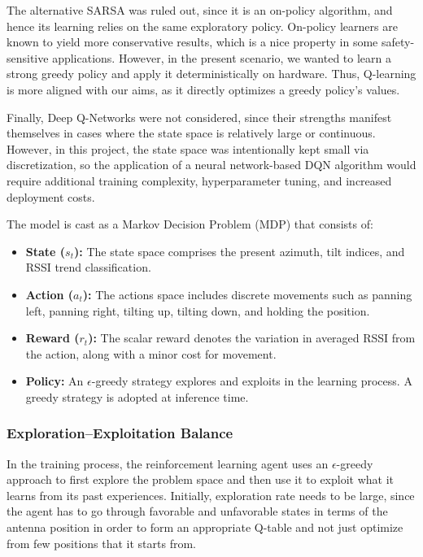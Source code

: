 The alternative SARSA was ruled out, since it is an on-policy algorithm, and hence its
learning relies on the same exploratory policy. On-policy learners are known to yield more
conservative results, which is a nice property in some safety-sensitive applications.
However, in the present scenario, we wanted to learn a strong greedy policy and apply it
deterministically on hardware. Thus, Q-learning is more aligned with our aims, as it
directly optimizes a greedy policy's values.

Finally, Deep Q-Networks were not considered, since their strengths manifest themselves
in cases where the state space is relatively large or continuous. However, in this project,
the state space was intentionally kept small via discretization, so the application of a
neural network-based DQN algorithm would require additional training complexity,
hyperparameter tuning, and increased deployment costs.

The model is cast as a Markov Decision Problem (MDP) that consists of:
\begin{itemize}
    \item \textbf{State ($s_t$):} The state space comprises the present azimuth,
    tilt indices, and RSSI trend classification.
    \item \textbf{Action ($a_t$):} The actions space includes discrete movements
    such as panning left, panning right, tilting up, tilting down, and holding the position.
    \item \textbf{Reward ($r_t$):} The scalar reward denotes the variation in
    averaged RSSI from the action, along with a minor cost for movement.
    \item \textbf{Policy:} An $\epsilon$-greedy strategy explores and exploits in
    the learning process. A greedy strategy is adopted at inference time.
\end{itemize}

\subsubsection{Exploration--Exploitation Balance}

In the training process, the reinforcement learning agent uses an $\epsilon$-greedy approach
to first explore the problem space and then use it to exploit what it learns from its past
experiences. Initially, exploration rate needs to be large, since the agent has to go through
favorable and unfavorable states in terms of the antenna position in order to form an
appropriate Q-table and not just optimize from few positions that it starts from.

